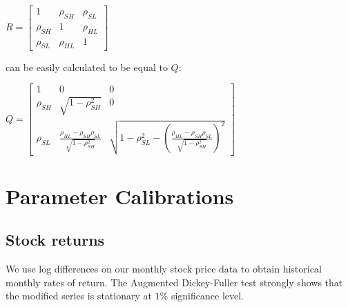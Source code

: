 \documentclass[]{elsarticle}
\begin{document}
\begin{appendix}
\begin{center}
	$R = \begin{bmatrix}
					1 & \rho_{SH} & \rho_{SL} \\
					\rho_{SH} & 1 & \rho_{HL} \\
					\rho_{SL} & \rho_{HL} & 1
			\end{bmatrix}
	$
\end{center}

can be easily calculated to be equal to $Q$:

\begin{center}
	$Q = \begin{bmatrix}
					1 & 0 & 0 \\
					\rho_{SH} & \sqrt{1-\rho^2_{SH}} & 0 \\
					\rho_{SL} & \frac{\rho_{HL} - \rho_{SH}\rho_{SL}}{\sqrt{1-\rho^2_{SH}}} & \sqrt{1-\rho^2_{SL}-(\frac{\rho_{HL} - \rho_{SH}\rho_{SL}}{\sqrt{1-\rho^2_{SH}}})^2}
			\end{bmatrix}
	$
\end{center}


\newpage
\section{Parameter Calibrations}
\label{paramcalib}

\subsection{Stock returns}
\label{paramcalibx}
We use log differences on our monthly stock price data to obtain historical monthly rates of return. The Augmented Dickey-Fuller test strongly shows that the modified series is stationary at $1\%$ significance level.


\end{appendix}
\end{document}
